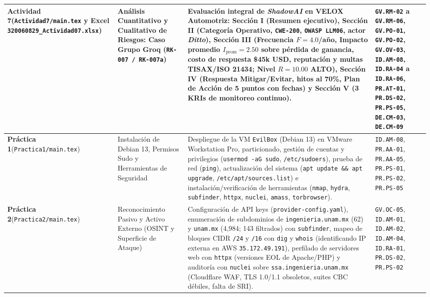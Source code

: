 \documentclass[letterpaper,11pt]{article}
\begin{document}
\begin{longtable}{|L{2.8cm}|L{3.5cm}|L{6.2cm}|C{3.8cm}|}
\textbf{Actividad 7}\newline (\texttt{Actividad7/main.tex} y Excel \texttt{320060829\_Actividad07.xlsx}) &
Análisis Cuantitativo y Cualitativo de Riesgos: Caso Grupo Groq (\texttt{RK-007 / RK-007a}) &
Evaluación integral de \textit{ShadowAI} en VELOX Automotriz: Sección I (Resumen ejecutivo), Sección II (Categoría Operativo, \texttt{CWE-200}, \texttt{OWASP LLM06}, actor \textit{Ditto}), Sección III (Frecuencia $F=4.0$/año, Impacto promedio $I_{\text{prom}}=2.50$ sobre pérdida de ganancia, costo de respuesta \$45k USD, reputación y multas TISAX/ISO 21434; Nivel $R=10.00$ ALTO), Sección IV (Respuesta Mitigar/Evitar, hitos al 70\%, Plan de Acción de 5 puntos con fechas) y Sección V (3 KRIs de monitoreo continuo). &
\texttt{GV.RM-02} a \texttt{GV.RM-06}, \texttt{GV.PO-01}, \texttt{GV.PO-02}, \texttt{GV.OV-03}, \texttt{ID.AM-08}, \texttt{ID.RA-04} a \texttt{ID.RA-06}, \texttt{PR.AT-01}, \texttt{PR.DS-02}, \texttt{PR.PS-05}, \texttt{DE.CM-03}, \texttt{DE.CM-09} \\
\hline

\textbf{Práctica 1}\newline (\texttt{Practica1/main.tex}) &
Instalación de Debian 13, Permisos Sudo y Herramientas de Seguridad &
Despliegue de la VM \texttt{EvilBox} (Debian 13) en VMware Workstation Pro, particionado, gestión de cuentas y privilegios (\texttt{usermod -aG sudo}, \texttt{/etc/sudoers}), prueba de red (\texttt{ping}), actualización del sistema (\texttt{apt update \&\& apt upgrade}, \texttt{/etc/apt/sources.list}) e instalación/verificación de herramientas (\texttt{nmap}, \texttt{hydra}, \texttt{subfinder}, \texttt{httpx}, \texttt{nuclei}, \texttt{amass}, \texttt{torbrowser}). &
\texttt{ID.AM-08}, \texttt{PR.AA-01}, \texttt{PR.AA-05}, \texttt{PR.PS-01}, \texttt{PR.PS-02}, \texttt{PR.PS-05} \\
\hline

\textbf{Práctica 2}\newline (\texttt{Practica2/main.tex}) &
Reconocimiento Pasivo y Activo Externo (OSINT y Superficie de Ataque) &
Configuración de API keys (\texttt{provider-config.yaml}), enumeración de subdominios de \texttt{ingenieria.unam.mx} (62) y \texttt{unam.mx} (4,984; 143 filtrados) con \texttt{subfinder}, mapeo de bloques CIDR \texttt{/24} y \texttt{/16} con \texttt{dig} y \texttt{whois} (identificando IP externa en AWS \texttt{35.172.49.191}), perfilado de servidores web con \texttt{httpx} (versiones EOL de Apache/PHP) y auditoría con \texttt{nuclei} sobre \texttt{ssa.ingenieria.unam.mx} (Cloudflare WAF, TLS 1.0/1.1 obsoletos, suites CBC débiles, falta de SRI). &
\texttt{GV.OC-05}, \texttt{ID.AM-01}, \texttt{ID.AM-02}, \texttt{ID.AM-04}, \texttt{ID.RA-01}, \texttt{PR.DS-02}, \texttt{PR.PS-02} \\
\hline


\end{longtable}
\end{document}
